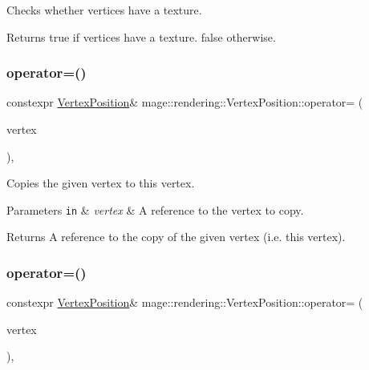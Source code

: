 Checks whether vertices have a texture.

\begin{DoxyReturn}{Returns}
{\ttfamily true} if vertices have a texture. {\ttfamily false} otherwise. 
\end{DoxyReturn}
\mbox{\label{structmage_1_1rendering_1_1_vertex_position_a9b25981be6c9b46f6c8c4dbc0c143fc6}} 
\subsubsection{\texorpdfstring{operator=()}{operator=()}\hspace{0.1cm}{\footnotesize\ttfamily [1/2]}}
{\footnotesize\ttfamily constexpr \mbox{\hyperlink{structmage_1_1rendering_1_1_vertex_position}{Vertex\+Position}}\& mage\+::rendering\+::\+Vertex\+Position\+::operator= (\begin{DoxyParamCaption}\item[{const \mbox{\hyperlink{structmage_1_1rendering_1_1_vertex_position}{Vertex\+Position}} \&}]{vertex }\end{DoxyParamCaption})\hspace{0.3cm}{\ttfamily [default]}, {\ttfamily [noexcept]}}

Copies the given vertex to this vertex.


\begin{DoxyParams}[1]{Parameters}
\mbox{\tt in}  & {\em vertex} & A reference to the vertex to copy. \\
\hline
\end{DoxyParams}
\begin{DoxyReturn}{Returns}
A reference to the copy of the given vertex (i.\+e. this vertex). 
\end{DoxyReturn}
\mbox{\label{structmage_1_1rendering_1_1_vertex_position_a1bb8da5039eae002fbfc446a5a4d8c4a}} 
\subsubsection{\texorpdfstring{operator=()}{operator=()}\hspace{0.1cm}{\footnotesize\ttfamily [2/2]}}
{\footnotesize\ttfamily constexpr \mbox{\hyperlink{structmage_1_1rendering_1_1_vertex_position}{Vertex\+Position}}\& mage\+::rendering\+::\+Vertex\+Position\+::operator= (\begin{DoxyParamCaption}\item[{\mbox{\hyperlink{structmage_1_1rendering_1_1_vertex_position}{Vertex\+Position}} \&\&}]{vertex }\end{DoxyParamCaption})\hspace{0.3cm}{\ttfamily [default]}, {\ttfamily [noexcept]}}

